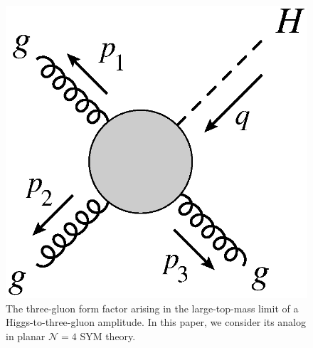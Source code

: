 \documentclass[12pt]{article}
\begin{document}
\begin{figure}[t]
    \centering
  \begin{minipage}[b]{0.25\textwidth}
    \includegraphics[width=\textwidth]{Hggg_process.eps}
  \end{minipage}
   \caption{The three-gluon form factor arising in the large-top-mass limit of a Higgs-to-three-gluon amplitude. In this paper, we consider its analog in planar $\mathcal{N}=4$ SYM theory.}
    \label{fig:three-gluon-form-factor}
\end{figure}

\end{document}
